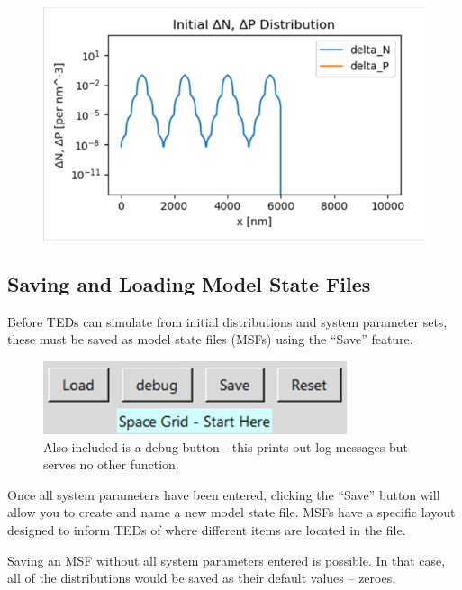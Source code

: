 \documentclass[11pt,letterpaper,titlepage]{article}
\begin{document}
		\begin{figure}[H]
			\label{fig:listupload_example_plot}
			\centering
			\includegraphics[scale=1]{"listupload_example_plot"}
		\end{figure}
	
		\subsection{Saving and Loading Model State Files}
		
		\par Before TEDs can simulate from initial distributions and system parameter sets, these must be saved as model state files (MSFs) using the “Save” feature.
		
		\begin{figure}[H]
			\label{fig:save_menu}
			\centering
			\includegraphics[scale=1]{"save_menu"}
			\caption{Also included is a debug button - this prints out log messages but serves no other function.}
		\end{figure}
	
		\par Once all system parameters have been entered, clicking the “Save” button will allow you to create and name a new model state file. MSFs have a specific layout designed to inform TEDs of where different items are located in the file.
		
		\par Saving an MSF without all system parameters entered is possible. In that case, all of the distributions would be saved as their default values – zeroes.
		
\end{document}
